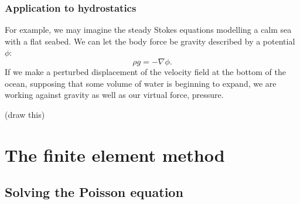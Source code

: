 \documentclass[11pt,a4paper]{memoir}
\begin{document}
\subsection{Application to hydrostatics}
For example, we may imagine the steady Stokes equations modelling a calm sea with a flat seabed.
We can let the body force be gravity described by a potential $\phi$:
    $$\rho g = -\nabla \phi.$$
If we make a perturbed displacement of the velocity field at the bottom of the ocean, supposing that some volume of water
is beginning to expand,
we are working against gravity as well as our virtual force, pressure.

\vskip 0.2in
(draw this)
\vskip 0.2in




\chapter{The finite element method}

\section{Solving the Poisson equation}
\end{document}
